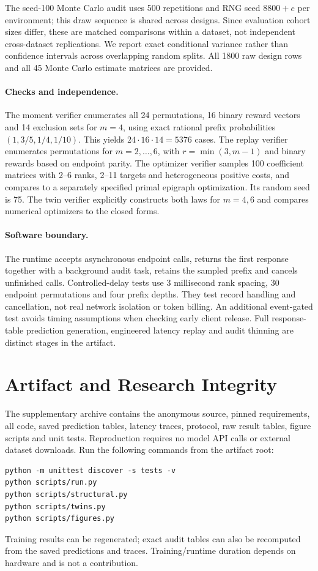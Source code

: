 \documentclass[12pt]{clear2027}
\begin{document}
The seed-100 Monte Carlo audit uses 500 repetitions and RNG seed $8800+e$ per environment; this draw sequence is shared across designs. Since evaluation cohort sizes differ, these are matched comparisons within a dataset, not independent cross-dataset replications. We report exact conditional variance rather than confidence intervals across overlapping random splits. All 1800 raw design rows and all 45 Monte Carlo estimate matrices are provided.

\paragraph{Checks and independence.}
The moment verifier enumerates all 24 permutations, 16 binary reward vectors and 14 exclusion sets for $m=4$, using exact rational prefix probabilities $(1,3/5,1/4,1/10)$. This yields $24\cdot16\cdot14=5376$ cases. The replay verifier enumerates permutations for $m=2,\ldots,6$, with $r=\min(3,m-1)$ and binary rewards based on endpoint parity. The optimizer verifier samples 100 coefficient matrices with 2--6 ranks, 2--11 targets and heterogeneous positive costs, and compares to a separately specified primal epigraph optimization. Its random seed is 75. The twin verifier explicitly constructs both laws for $m=4,6$ and compares numerical optimizers to the closed forms.

\paragraph{Software boundary.}
The runtime accepts asynchronous endpoint calls, returns the first response together with a background audit task, retains the sampled prefix and cancels unfinished calls. Controlled-delay tests use $3$ millisecond rank spacing, 30 endpoint permutations and four prefix depths. They test record handling and cancellation, not real network isolation or token billing. An additional event-gated test avoids timing assumptions when checking early client release. Full response-table prediction generation, engineered latency replay and audit thinning are distinct stages in the artifact.

\section{Artifact and Research Integrity}
The supplementary archive contains the anonymous source, pinned requirements, all code, saved prediction tables, latency traces, protocol, raw result tables, figure scripts and unit tests. Reproduction requires no model API calls or external dataset downloads. Run the following commands from the artifact root:
\begin{verbatim}
python -m unittest discover -s tests -v
python scripts/run.py
python scripts/structural.py
python scripts/twins.py
python scripts/figures.py
\end{verbatim} Training results can be regenerated; exact audit tables can also be recomputed from the saved predictions and traces. Training/runtime duration depends on hardware and is not a contribution.
\end{document}
